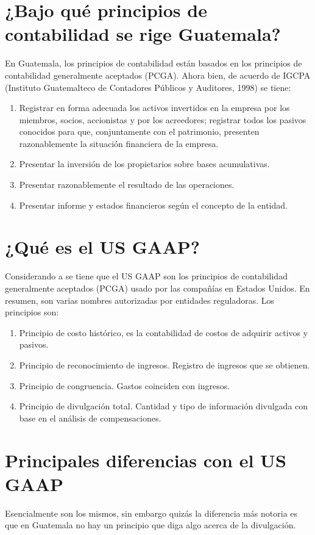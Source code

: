 





\section{¿Bajo qué principios de contabilidad se rige Guatemala?}

En Guatemala, los principios de contabilidad están basados en los principios de contabilidad generalmente aceptados (PCGA). Ahora bien, de acuerdo de IGCPA (Instituto Guatemalteco de Contadores Públicos y Auditores, 1998)\cite{conta1} se tiene: 


\begin{enumerate}
    \item Registrar en forma adecuada los activos invertidos en la empresa por los miembros, socios, accionistas y por los acreedores; registrar todos los pasivos conocidos para que, conjuntamente con el patrimonio, presenten razonablemente la situación financiera de la empresa. 
    \item Presentar la inversión de los propietarios sobre bases acumulativas. 
    \item Presentar razonablemente el resultado de las operaciones. 
    \item Presentar informe y estados financieros según el concepto de la entidad.
\end{enumerate}





\section{¿Qué es el US GAAP?}

Considerando a \cite{conta2} se tiene que el US GAAP son los principios de contabilidad generalmente aceptados (PCGA) usado por las compañías en Estados Unidos. En resumen, son varias nombres autorizadas por entidades reguladoras. Los principios son: 

\begin{enumerate}
    \item Principio de costo histórico, es la contabilidad de costos de adquirir activos y pasivos. 
    \item Principio de reconocimiento de ingresos. Registro de ingresos que se obtienen.
    \item Principio de congruencia. Gastos coinciden con ingresos. 
    \item Principio de divulgación total. Cantidad y tipo de información divulgada con base en el análisis de compensaciones. 
\end{enumerate}

\section{Principales diferencias con el US GAAP}

Esencialmente son los mismos, sin embargo quizás la diferencia más notoria es que en Guatemala no hay un principio que diga algo acerca de la divulgación.







